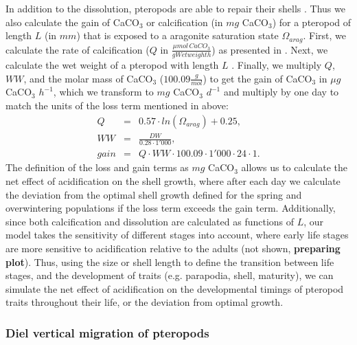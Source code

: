 In addition to the dissolution, pteropods are able to repair their shells \citep{Bednarsek2014CalcificationDissolution}. Thus we also calculate the gain of CaCO$_3$ or calcification (in $mg$ CaCO$_3$) for a pteropod of length $L$ (in $mm$) that is exposed to a aragonite saturation state $\Omega_{arag}$. First, we calculate the rate of calcification ($Q$ in $\frac{\mu mol \, CaCO_3}{g Wet weight h}$) as presented in \citep{Comeau2010RepairRates}. Next, we calculate the wet weight of a pteropod with length $L$ \citep[$WW$ in $g$; ][]{Bednarsek2014CalcificationDissolution}. Finally, we multiply $Q$, $WW$, and the molar mass of CaCO$_3$ ($100.09 \frac{g}{mol}$) to get the gain of CaCO$_3$ in $\mu g$ CaCO$_3$ $h^{-1}$, which we transform to $mg$ CaCO$_3$ $d^{-1}$ and multiply by one day to match the units of the loss term mentioned in above:
\begin{eqnarray}
Q & = & 0.57 \cdot ln(\Omega_{arag}) + 0.25, \\
WW & = & \frac{DW}{0.28 \cdot 1'000}, \\
gain & = & Q \cdot WW \cdot 100.09 \cdot 1'000 \cdot 24 \cdot 1.
\end{eqnarray}
\noindent
The definition of the loss and gain terms as $mg$ CaCO$_3$ allows us to calculate the net effect of acidification on the shell growth, where after each day we calculate the deviation from the optimal shell growth defined for the spring and overwintering populations if the loss term exceeds the gain term. Additionally, since both calcification and dissolution are calculated as functions of $L$, our model takes the sensitivity of different stages into account, where early life stages are more sensitive to acidification relative to the adults (not shown, \textbf{preparing plot}).
Thus, using the size or shell length to define the transition between life stages, and the development of traits (e.g. parapodia, shell, maturity), we can simulate the net effect of acidification on the developmental timings of pteropod traits throughout their life, or the deviation from optimal growth.


\subsubsection{Diel vertical migration of pteropods}\label{sec:dvm}

